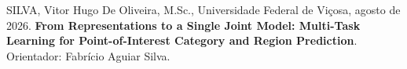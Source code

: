     \begin{resumo}[Resumo]
        \singlespacing
        SILVA, Vitor Hugo De Oliveira, M.Sc., Universidade Federal de Viçosa, agosto de 2026.
        \textbf{From Representations to a Single Joint Model: Multi-Task Learning for Point-of-Interest Category and Region Prediction}. Orientador: Fabrício Aguiar Silva.
        \vspace{\onelineskip}


\end{resumo}
